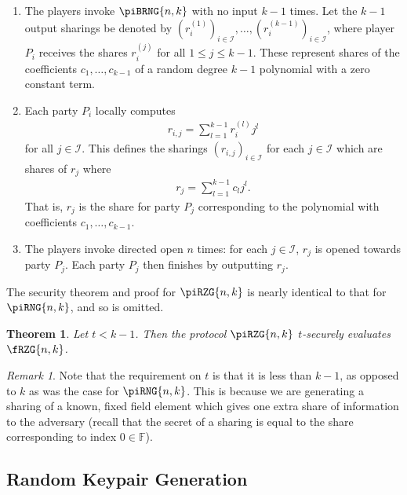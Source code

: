 \documentclass{article}
\newtheorem{theorem}{Theorem}
\theoremstyle{remark}
\newtheorem{remark}{Remark}
\newcommand{\F}{\mathbb{F}}
\begin{document}
\begin{enumerate}
	\item The players invoke $\piBRNG{n,k}$ with no input $k-1$ times. Let the
		$k-1$ output sharings be denoted by ${\left(r_i^{(1)}\right)}_{i \in
		\mathcal{I}}, \ldots, {\left(r_i^{(k-1)}\right)}_{i \in \mathcal{I}}$,
		where player $P_i$ receives the shares $r_i^{(j)}$ for all $1 \le j \le
		k-1$. These represent shares of the coefficients $c_1, \ldots, c_{k-1}$
		of a random degree $k-1$ polynomial with a zero constant term.

	\item Each party $P_i$ locally computes
		\begin{align*}
			r_{i,j} = \sum_{l=1}^{k-1} r_i^{(l)} j^l
		\end{align*}
		for all $j \in \mathcal{I}$. This defines the sharings ${(r_{i,j})}_{i
		\in \mathcal{I}}$ for each $j \in \mathcal{I}$ which are shares of
		$r_j$ where
		\begin{align*}
			r_j = \sum_{l=1}^{k-1} c_l j^l.
		\end{align*}
		That is, $r_j$ is the share for party $P_j$ corresponding to the
		polynomial with coefficients $c_1, \ldots, c_{k-1}$.

	\item The players invoke directed open $n$ times: for each $j \in
		\mathcal{I}$, $r_j$ is opened towards party $P_j$. Each party $P_j$
		then finishes by outputting $r_j$.
\end{enumerate}

The security theorem and proof for $\piRZG{n,k}$ is nearly identical to that
for $\piRNG{n,k}$, and so is omitted.

\begin{theorem}
	Let $t < k - 1$. Then the protocol $\piRZG{n,k}$ $t$-securely evaluates
	$\fRZG{n,k}$.
\end{theorem}

\begin{remark}
	Note that the requirement on $t$ is that it is less than $k - 1$, as
	opposed to $k$ as was the case for $\piRNG{n,k}$. This is because we are
	generating a sharing of a known, fixed field element which gives one extra
	share of information to the adversary (recall that the secret of a sharing
	is equal to the share corresponding to index $0 \in \F$).
\end{remark}

\subsection{Random Keypair Generation}\label{sec:rkpg}
\end{document}
